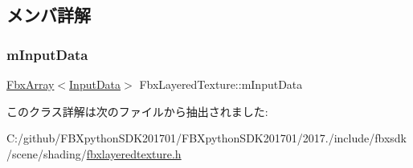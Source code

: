 \subsection{メンバ詳解}
\mbox{\label{class_fbx_layered_texture_ae06d32684ea2f049c21abb66dfc30d4f}} 
\subsubsection{\texorpdfstring{m\+Input\+Data}{mInputData}}
{\footnotesize\ttfamily \hyperlink{class_fbx_array}{Fbx\+Array}$<$\hyperlink{struct_fbx_layered_texture_1_1_input_data}{Input\+Data}$>$ Fbx\+Layered\+Texture\+::m\+Input\+Data}



このクラス詳解は次のファイルから抽出されました\+:\begin{DoxyCompactItemize}
\item 
C\+:/github/\+F\+B\+Xpython\+S\+D\+K201701/\+F\+B\+Xpython\+S\+D\+K201701/2017./include/fbxsdk/scene/shading/\hyperlink{fbxlayeredtexture_8h}{fbxlayeredtexture.\+h}\end{DoxyCompactItemize}
